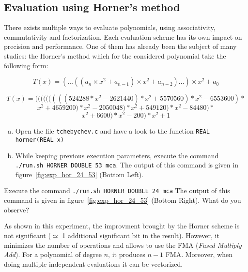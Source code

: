 \FloatBarrier

\subsection{Evaluation using Horner's method}
There exists multiple ways to evaluate polynomials, using associativity, commutativity and factorization. 
Each evaluation scheme has its own impact on precision and performance. 
One of them has already been the subject of many studies: the Horner's method which for the considered polynomial take the following form:

\[
	T(x) = (\dots((a_n\times x^2 + a_{n-1})\times x^2 + a_{n-2})\dots) \times x^2
    + a_0
\]

$$T(x) = (((((((((524288*x^2-2621440)*x^2+5570560)*x^2-6553600)*$$
$$x^2+4659200)*x^2-2050048)*x^2+549120)*x^2-84480)*$$
$$x^2+6600)*x^2-200)*x^2+1$$

\begin{question}
  \begin{enumerate}[(a)]
  \item Open the file {\tt tchebychev.c} and have a look to the function {\tt REAL horner(REAL x)}
\item While keeping previous execution parameters, execute the command {\tt ./run.sh HORNER DOUBLE 53 mca}.  \newline The output of this command is given in figure~\ref{fig:exp_hor_24_53} (Bottom Left).
  \end{enumerate}
\end{question}

\begin{question}
\item Execute the command {\tt ./run.sh HORNER DOUBLE 24 mca}  \newline
The output of this command is given in figure~\ref{fig:exp_hor_24_53} (Bottom Right).
What do you observe?
\end{question}

As shown in this experiment, the improvment brought by the Horner scheme is not significant ($\simeq$ 1 additional significant bit in the result). 
 However, it minimizes the
number of operations and allows to use the FMA ({\it Fused Multiply Add}). For
a polynomial of degree $n$, it produces $n-1$ FMA. Moreover, when doing
multiple independent evaluations it can be vectorized.

